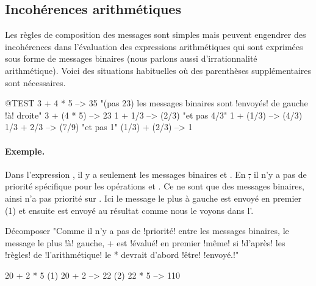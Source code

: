 \documentclass[a4paper,10pt,twoside]{book}
\begin{document}
\subsection{Incohérences arithmétiques}
Les règles de composition des messages sont simples mais peuvent
engendrer des incohérences dans l'évaluation des expressions
arithmétiques qui sont exprimées sous forme de messages binaires
(nous parlons aussi d'irrationnalité arithmétique).
Voici des situations habituelles où des parenthèses supplémentaires sont nécessaires.

\begin{code}{@TEST}
3 + 4 * 5      --> 35    "(pas 23)  les messages binaires sont !envoyés! de gauche !à! droite"
3 + (4 * 5)    --> 23
1 + 1/3         --> (2/3)    "et pas 4/3"
1 + (1/3)       --> (4/3)
1/3 + 2/3       --> (7/9)    "et pas 1"
(1/3) + (2/3)  --> 1
\end{code}

\paragraph{Exemple.} 
Dans l'expression , il y a seulement les messages
binaires \ct{+} et \ct{*}. En \st, il n'y a pas de priorité
spécifique pour les opérations \ct{+} et \ct{*}. Ce ne sont que
des messages binaires, ainsi \ct{*} n'a pas priorité sur \ct{+}. Ici
le message le plus à gauche \ct{+} est envoyé en premier (1) et
ensuite \ct{*} est envoyé au résultat comme nous le voyons dans l'.  

\begin{example}[binaryMessages1]{Décomposer }{}
"Comme il n'y a pas de !priorité! entre les messages binaires, le message le plus !à! gauche, + est !évalué! en premier !même! si !d'après! les !règles! de !l'arithmétique! le * devrait d'abord !être! !envoyé.!"

      20 + 2 * 5 
(1)  20 + 2 --> 22
(2)  22       * 5 --> 110
\end{example}
\end{document}
